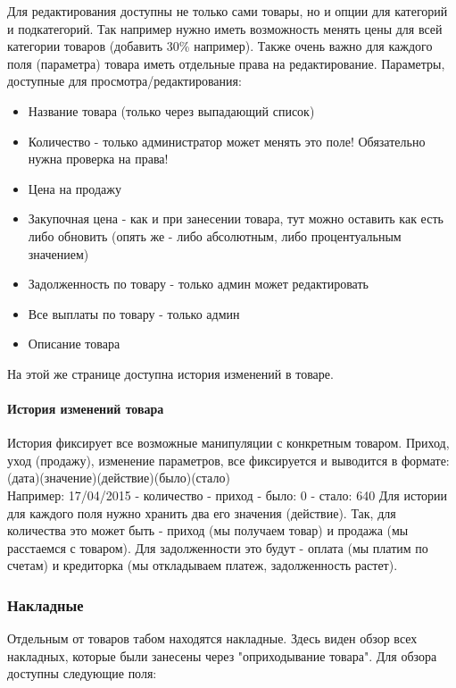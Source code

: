 \documentclass[DIV=calc, paper=a4, fontsize=11pt]{scrartcl} %
\begin{document}
Для редактирования доступны не только сами товары, но и опции для категорий и подкатегорий. Так например нужно иметь возможность менять цены для всей категории товаров (добавить 30\% например). Также очень важно для каждого поля (параметра) товара иметь отдельные права на редактирование. Параметры, доступные для просмотра/редактирования:
\begin{itemize}
	\item Название товара (только через выпадающий список)
	\item Количество - только администратор может менять это поле! Обязательно нужна проверка на права!
	\item Цена на продажу
	\item Закупочная цена - как и при занесении товара, тут можно оставить как есть либо обновить (опять же - либо абсолютным, либо процентуальным значением)
	\item Задолженность по товару - только админ может редактировать
	\item Все выплаты по товару - только админ
	\item Описание товара
\end{itemize}

На этой же странице доступна история изменений в товаре.

\paragraph{История изменений товара}
История фиксирует все возможные манипуляции с конкретным товаром. Приход, уход (продажу), изменение параметров, все фиксируется и выводится в формате:
\\[0.5cm](дата)(значение)(действие)(было)(стало)
\\[0.5cm]Например: 17/04/2015 - количество - приход - было: 0 - стало: 640
Для истории для каждого поля нужно хранить два его значения (действие). Так, для количества это может быть - приход (мы получаем товар) и продажа (мы расстаемся с товаром). Для задолженности это будут - оплата (мы платим по счетам) и кредиторка (мы откладываем платеж, задолженность растет).

\subsubsection{Накладные}
Отдельным от товаров табом находятся накладные. Здесь виден обзор всех накладных, которые были занесены через "оприходывание товара". Для обзора доступны следующие поля:
\end{document}

